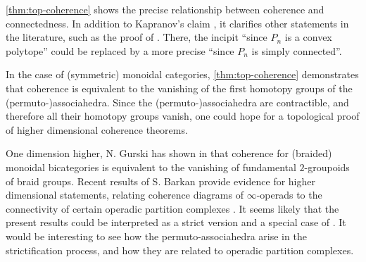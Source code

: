 \cref{thm:top-coherence} shows the precise relationship between coherence and connectedness.
In addition to Kapranov's claim \cite{kapranov1993}, it clarifies other statements in the literature, such as the proof of \cite[Prop.~3.9]{KapranovVoevodsky94}.
There, the incipit ``since $P_n$ is a convex polytope'' could be replaced by a more precise ``since $P_n$ is simply connected''.

In the case of (symmetric) monoidal categories, \cref{thm:top-coherence} demonstrates that coherence is equivalent to the vanishing of the first homotopy groups of the (permuto-)associahedra. 
Since the (permuto-)associahedra are contractible, and therefore all their homotopy groups vanish, one could hope for a topological proof of higher dimensional coherence theorems.

One dimension higher, N. Gurski has shown in \cite[Thms.~22 \& 23]{Gurski11} that coherence for (braided) monoidal bicategories is equivalent to the vanishing of fundamental $2$-groupoids of braid groups.
Recent results of S. Barkan provide evidence for higher dimensional statements, relating coherence diagrams of $\infty$-operads to the connectivity of certain operadic partition complexes \cite{barkanArityApproximationInfty2022}.
It seems likely that the present results could be interpreted as a strict version and a special case of \cite[Thm.~B]{barkanArityApproximationInfty2022}. 
It would be interesting to see how the permuto-associahedra arise in the strictification process, and how they are related to operadic partition complexes.  



